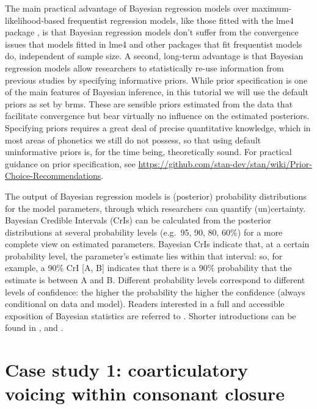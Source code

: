 \documentclass[
  authoryear,
  preprint,
  3p]{elsarticle}
\begin{document}
The main practical advantage of Bayesian regression models over
maximum-likelihood-based frequentist regression models, like those
fitted with the lme4 package \citep{bates2015}, is that Bayesian
regression models don't suffer from the convergence issues that models
fitted in lme4 \citep{bates2015} and other packages
\citep{cribarineto2010} that fit frequentist models do, independent of
sample size. A second, long-term advantage is that Bayesian regression
models allow researchers to statistically re-use information from
previous studies by specifying informative priors. While prior
specification is one of the main features of Bayesian inference, in this
tutorial we will use the default priors as set by brms. These are
sensible priors estimated from the data that facilitate convergence but
bear virtually no influence on the estimated posteriors. Specifying
priors requires a great deal of precise quantitative knowledge, which in
most areas of phonetics we still do not possess, so that using default
uninformative priors is, for the time being, theoretically sound. For
practical guidance on prior specification, see
\url{https://github.com/stan-dev/stan/wiki/Prior-Choice-Recommendations}.

The output of Bayesian regression models is (posterior) probability
distributions for the model parameters, through which researchers can
quantify (un)certainty. Bayesian Credible Intervals (CrIs) can be
calculated from the posterior distributions at several probability
levels (e.g.~95, 90, 80, 60\%) for a more complete view on estimated
parameters. Bayesian CrIs indicate that, at a certain probability level,
the parameter's estimate lies within that interval: so, for example, a
90\% CrI {[}A, B{]} indicates that there is a 90\% probability that the
estimate is between A and B. Different probability levels correspond to
different levels of confidence: the higher the probability the higher
the confidence (always conditional on data and model). Readers
interested in a full and accessible exposition of Bayesian statistics
are referred to \citet{mcelreath2019}. Shorter introductions can be
found in \citet{etz2018}, \citet{vasishth2018} and
\citet{nalborczyk2019}.

\section{Case study 1: coarticulatory voicing within consonant
closure}\label{sec-case-1}
\end{document}
